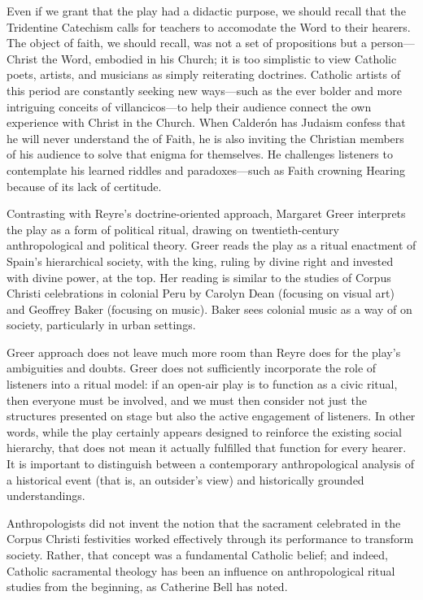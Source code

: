 Even if we grant that the play had a didactic purpose, we should recall that the Tridentine Catechism calls for teachers to accomodate the Word to their hearers.
The object of faith, we should recall, was not a set of propositions but a person---Christ the Word, embodied in his Church; it is too simplistic to view Catholic poets, artists, and musicians as simply reiterating doctrines.
Catholic artists of this period are constantly seeking new ways---such as the ever bolder and more intriguing conceits of villancicos---to help their audience connect the own experience with Christ in the Church.
When Calderón has Judaism confess that he will never understand the  of Faith, he is also inviting the Christian members of his audience to solve that enigma for themselves.
He challenges listeners to contemplate his learned riddles and paradoxes---such as Faith crowning Hearing because of its lack of certitude.

Contrasting with Reyre's doctrine-oriented approach, Margaret Greer interprets the play as a form of political ritual, drawing on twentieth-century anthropological and political theory.
Greer reads the play as a ritual enactment of Spain's hierarchical society, with the king, ruling by divine right and invested with divine power, at the top.
Her reading is similar to the studies of Corpus Christi celebrations in colonial Peru by Carolyn Dean (focusing on visual art) and Geoffrey Baker (focusing on music).%
  \autocites{Dean:Inka}{Baker:Harmony}{Baker:ResoundingCity}
Baker sees colonial music as a way of  on society, particularly in urban settings.

Greer approach does not leave much more room than Reyre does for the play's ambiguities and doubts.
Greer does not sufficiently incorporate the role of listeners into a ritual model: if an open-air play is to function as a civic ritual, then everyone must be involved, and we must then consider not just the structures presented on stage but also the active engagement of listeners.
In other words, while the play certainly appears designed to reinforce the existing social hierarchy, that does not mean it actually fulfilled that function for every hearer.
It is important to distinguish between a contemporary anthropological analysis of a historical event (that is, an outsider's view) and historically grounded understandings.

Anthropologists did not invent the notion that the sacrament celebrated in the Corpus Christi festivities worked effectively through its performance to transform society.
Rather, that concept was a fundamental Catholic belief; and indeed, Catholic sacramental theology has been an influence on anthropological ritual studies from the beginning, as Catherine Bell has noted.%
  \autocite[\XXX]{Bell:RitualPerspectives}


